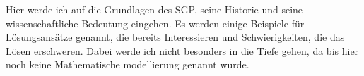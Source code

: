 Hier werde ich auf die Grundlagen des SGP, seine Historie und seine wissenschaftliche Bedeutung eingehen. Es werden einige Beispiele für Lösungsansätze genannt, die bereits Interessieren und Schwierigkeiten, die das Lösen erschweren.
Dabei werde ich nicht besonders in die Tiefe gehen, da bis hier noch keine Mathematische modellierung genannt wurde.
